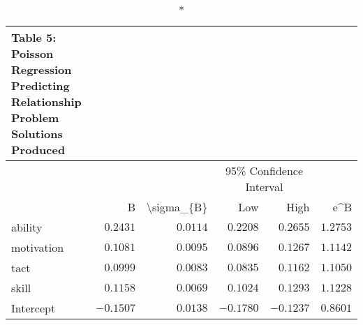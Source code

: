 \begin{longtable}{l|rrrrr}
\caption*{
{\large Table 5: Poisson Regression Predicting Relationship Problem Solutions Produced}
} \\ 
\toprule
\multicolumn{1}{l}{} &  &  & \multicolumn{2}{c}{95\% Confidence Interval} &  \\ 
\cmidrule(lr){4-5}
\multicolumn{1}{l}{} & B & \textbackslash{}sigma\_\{B\} & Low & High & e\textasciicircum{}B \\ 
\midrule\addlinespace[2.5pt]
ability & $0.2431$ & $0.0114$ & $0.2208$ & $0.2655$ & $1.2753$ \\ 
motivation & $0.1081$ & $0.0095$ & $0.0896$ & $0.1267$ & $1.1142$ \\ 
tact & $0.0999$ & $0.0083$ & $0.0835$ & $0.1162$ & $1.1050$ \\ 
skill & $0.1158$ & $0.0069$ & $0.1024$ & $0.1293$ & $1.1228$ \\ 
Intercept & $-0.1507$ & $0.0138$ & $-0.1780$ & $-0.1237$ & $0.8601$ \\ 
\bottomrule
\end{longtable}

